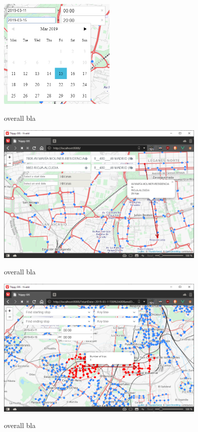 	\begin{figure}[ht]
		\begin{center}
			{\includegraphics[width=0.5\textwidth]{screens/date_cut.png}}
		\end{center}
		\caption{overall bla}
		\label{fig:ui:date}
	\end{figure}
	
	\begin{figure}[ht]
		\begin{center}
			{\includegraphics[width=0.9\textwidth]{screens/xy.png}}
		\end{center}
		\caption{overall bla}
		\label{fig:ui:xy}
	\end{figure}
	
	\begin{figure}[ht]
		\begin{center}
			{\includegraphics[width=0.9\textwidth]{screens/xy_area.png}}
		\end{center}
		\caption{overall bla}
		\label{fig:ui:xyarea}
	\end{figure}
    
